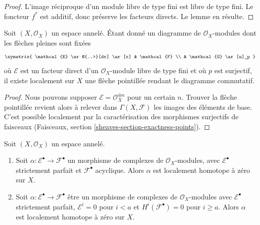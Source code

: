 \begin{proof}

L'image réciproque d'un module libre de type fini est libre de type fini.
Le foncteur $f^*$ est additif, donc préserve les facteurs directs. Le lemme en résulte.

\end{proof}

\begin{lemma}

\label{lemma-local-lift-map}
Soit $(X, \mathcal{O}_X)$ un espace annelé. Étant donné un diagramme de $\mathcal{O}_X$-modules dont les flèches pleines sont fixées $$
\xymatrix{
\mathcal{E} \ar@{..>}[dr] \ar[r] & \mathcal{F} \\
& \mathcal{G} \ar[u]_p
}
$$ où $\mathcal{E}$ est un facteur direct d'un $\mathcal{O}_X$-module libre de type fini et où $p$ est surjectif, il existe localement sur $X$ une flèche pointillée rendant le diagramme commutatif.
\end{lemma}

\begin{proof}

Nous pouvons supposer $\mathcal{E} = \mathcal{O}_X^{\oplus n}$ pour un certain $n$. Trouver la flèche pointillée revient alors à relever dans $\Gamma(X, \mathcal{F})$ les images des éléments de base. C'est possible localement par la caractérisation des morphismes surjectifs de faisceaux (Faisceaux, section \ref{sheaves-section-exactness-points}).

\end{proof}

\begin{lemma}

\label{lemma-local-homotopy}

Soit $(X, \mathcal{O}_X)$ un espace annelé.

\begin{enumerate}

\item Soit $\alpha : \mathcal{E}^\bullet \to \mathcal{F}^\bullet$
un morphisme de complexes de $\mathcal{O}_X$-modules, avec $\mathcal{E}^\bullet$ strictement parfait et $\mathcal{F}^\bullet$
acyclique. Alors $\alpha$ est localement homotope à zéro sur $X$.
\item Soit $\alpha : \mathcal{E}^\bullet \to \mathcal{F}^\bullet$
être un morphisme de complexes de $\mathcal{O}_X$-modules avec $\mathcal{E}^\bullet$ strictement parfait, $\mathcal{E}^i = 0$
pour $i < a$ et $H^i(\mathcal{F}^\bullet) = 0$ pour $i \geq a$. Alors $\alpha$ est localement homotope à zéro sur $X$.

\end{enumerate}

\end{lemma}

